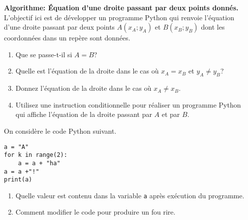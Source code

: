 \begin{exercise}
	\textbf{Algorithme: Équation d'une droite passant par deux points donnés.} L'objectif ici est de développer un programme Python qui renvoie l'équation d'une droite passant par deux points $A\left(x_A;y_A\right)$ et $B\left(x_B;y_B\right)$ dont les coordonnées dans un repère sont données.
	\begin{enumerate}
		\item Que se passe-t-il si $A=B$?
		\item Quelle est l'équation de la droite dans le cas où $x_A=x_B$ et $y_A\neq y_B$?
		\item Donnez l'équation de la droite dans le cas où $x_A\neq x_B$.
		\item Utilisez une instruction conditionnelle pour réaliser un programme Python qui affiche l'équation de la droite passant par $A$ et par $B$.
	\end{enumerate}
\end{exercise}


\newpage

\begin{exercise}
	On considère le code Python suivant.
	\begin{center}
		\begin{varwidth}[t]{\textwidth}
\begin{lstlisting}[language=iPython,linewidth = 5cm]
a = "A"
for k in range(2):
    a = a + "ha"
a = a +"!"
print(a)
\end{lstlisting}
		\end{varwidth}
	\end{center}	
	\begin{enumerate}
		\item Quelle valeur est contenu dans la variable \texttt{a} après exécution du programme.
		\item Comment modifier le code pour produire un fou rire.
	\end{enumerate}
\end{exercise}

